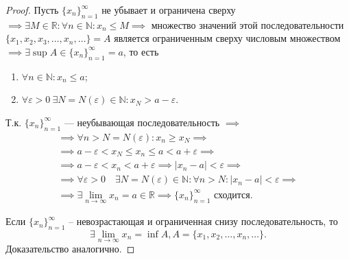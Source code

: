 \documentclass[a4paper,12pt]{article} %
\theoremstyle{remark}
\begin{document}
\begin{proof}
	Пусть $\{x_n\}_{n=1}^{\infty}$ не убывает и ограничена сверху $\implies\exists M\in \mathbb{R} :\forall n\in \mathbb{N}:x_{n}\le M\implies$ множество значений этой последовательности $\{x_1, x_2, x_3, \ldots, x_{n}, \ldots\}=A$ является ограниченным сверху числовым множеством $\implies\exists \sup A\in \{x_n\}_{n=1}^{\infty}=a$, то есть
	\begin{enumerate}
		\item $\forall n\in \mathbb{N}:x_{n}\le a$;
		\item $\forall \varepsilon>0 \ \exists N=N(\varepsilon)\in \mathbb{N}:x_{N}>a-\varepsilon$.
	\end{enumerate}

\begin{center}
\end{center}

Т.к. $\{x_n\}_{n=1}^{\infty}$ --- неубывающая последовательность $\implies$
\begin{multline}
\implies \forall n>N=N(\varepsilon):x_{n}\ge x_N \implies \\
\implies a-\varepsilon<x_N\le x_{n}\le a<a+\varepsilon\implies \\
\implies a-\varepsilon<x_{n}<a+\varepsilon \implies |x_{n}-a|<\varepsilon \implies \\
\implies \forall \varepsilon>0 \quad \exists N=N(\varepsilon)\in \mathbb{N}:\forall n>N:|x_{n}-a|<\varepsilon \implies \\
\implies \exists \lim_{n \to \infty}x_{n} = a\in \mathbb{R} \implies \{x_n\}_{n=1}^{\infty} \text{ сходится.}
\end{multline}

Если $\{x_n\}_{n=1}^{\infty}$ -- невозрастающая и ограниченная снизу последовательность, то 
\[
\exists \lim_{n \to \infty} x_{n}=\inf A, A = \{x_1, x_2, \ldots, x_{n}, \ldots\} 
.\] 
Доказательство аналогично.
\end{proof}
\end{document}
